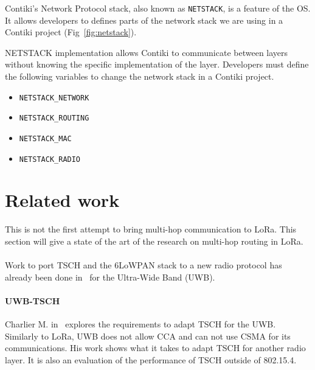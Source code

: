 Contiki's Network Protocol stack, also known as \lstinline{NETSTACK}, is a
feature of the OS.
It allows developers to defines parts of the network stack we are using in a Contiki
project (Fig~\ref{fig:netstack}).

NETSTACK implementation allows Contiki to communicate between layers without
knowing the specific implementation of the layer.
Developers must define the following variables to change the network stack
in a Contiki project.

\begin{itemize}
  \item \lstinline{NETSTACK_NETWORK}
  \item \lstinline{NETSTACK_ROUTING}
  \item \lstinline{NETSTACK_MAC}
  \item \lstinline{NETSTACK_RADIO}
\end{itemize}



\section{Related work}

This is not the first attempt to bring multi-hop communication to LoRa.
This section will give a state of the art of the research on
multi-hop routing in LoRa.

\paragraph{}

Work to port TSCH and the 6LoWPAN stack to a new radio protocol has already
been done in~\cite{uwbtsch} for the Ultra-Wide Band (UWB).


\paragraph{UWB-TSCH}

Charlier M. in~\cite{uwbtsch} explores the requirements to adapt TSCH for the UWB.
Similarly to LoRa, UWB does not allow CCA and can not use CSMA for its
communications.
His work shows what it takes to adapt TSCH for another radio layer.
It is also an evaluation of the performance of TSCH outside of 802.15.4.

